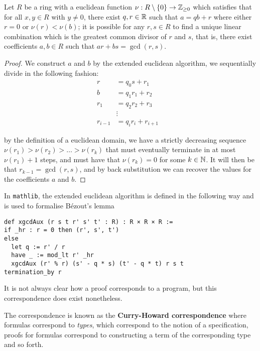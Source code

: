 \begin{example}
    Let $R$ be a ring with a euclidean function $\nu : R \setminus \{0\} \rightarrow \mathbb{Z}_{\geq 0}$ which satisfies that for all $x, y \in R$ with $y \ne 0$, there exist $q, r \in \mathbb{R}$ such that $a  = qb + r$ where either $r = 0$ or $\nu(r) < \nu(b)$;
it is possible for any $r,s \in R$ to find a unique linear combination which is the greatest common divisor of $r$ and $s$, that is, there exist coefficients $a, b \in R$ such that $ar + bs = \gcd(r, s)$.
\end{example}
\begin{proof}
    We construct $a$ and $b$ by the extended euclidean algorithm, we sequentially divide in the following fashion:
      \begin{align}
          r &= q_0 s + r_1\\
          b &= q_1 r_1 + r_2\\
          r_1 &= q_2 r_2 + r_3\\
          &\vdots\\
          r_{i-1} &= q_i r_i + r_{i + 1}&
      \end{align}
  
      by the definition of a euclidean domain, we have a strictly decreasing sequence $\nu(r_1) > \nu(r_2) > \ldots > \nu(r_k)$ that must eventually terminate in at most $\nu(r_1) + 1$ steps,
      and must have that $\nu(r_k) = 0$ for some $k \in \mathbb{N}$. It will then be that $r_{k -1} = \gcd(r, s)$, and by back substitution we can recover the values for the coefficients $a$ and $b$.
  \end{proof}

In \texttt{mathlib}, the extended euclidean algorithm is defined in the following way and is used to formalise Bézout's lemma

\begin{footnotesize}
\begin{verbatim}
def xgcdAux (r s t r' s' t' : R) : R × R × R :=
if _hr : r = 0 then (r', s', t')
else
  let q := r' / r
  have _ := mod_lt r' _hr
  xgcdAux (r' % r) (s' - q * s) (t' - q * t) r s t
termination_by r
\end{verbatim}
\end{footnotesize}

It is not always clear how a proof corresponds to a program, but this correspondence does exist nonetheless.

The correspondence is known as the \textbf{Curry-Howard correspondence} where formulas correspond to \textit{types}, which correspond to the notion of a specification, 
proofs for formulas correspond to constructing a term of the corresponding type and so forth. 


